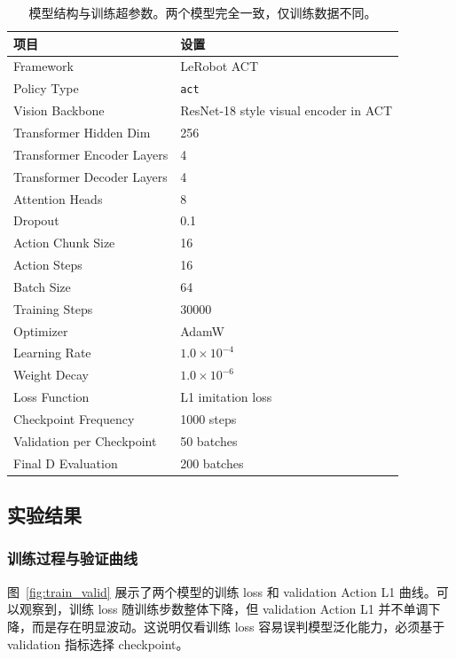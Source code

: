\documentclass[11pt,UTF8,fontset=fandol]{ctexart}
\newcommand{\actlone}{Action L1}
\begin{document}
\begin{table}[t]
\centering
\caption{模型结构与训练超参数。两个模型完全一致，仅训练数据不同。}
\label{tab:hparams}
\begin{tabular}{ll}
\toprule
项目 & 设置 \\
\midrule
Framework & LeRobot ACT \\
Policy Type & \texttt{act} \\
Vision Backbone & ResNet-18 style visual encoder in ACT \\
Transformer Hidden Dim & 256 \\
Transformer Encoder Layers & 4 \\
Transformer Decoder Layers & 4 \\
Attention Heads & 8 \\
Dropout & 0.1 \\
Action Chunk Size & 16 \\
Action Steps & 16 \\
Batch Size & 64 \\
Training Steps & 30000 \\
Optimizer & AdamW \\
Learning Rate & $1.0\times 10^{-4}$ \\
Weight Decay & $1.0\times 10^{-6}$ \\
Loss Function & L1 imitation loss \\
Checkpoint Frequency & 1000 steps \\
Validation per Checkpoint & 50 batches \\
Final D Evaluation & 200 batches \\
\bottomrule
\end{tabular}
\end{table}

\subsection{实验结果}
\subsubsection{训练过程与验证曲线}
图~\ref{fig:train_valid} 展示了两个模型的训练 loss 和 validation \actlone{} 曲线。可以观察到，训练 loss 随训练步数整体下降，但 validation \actlone{} 并不单调下降，而是存在明显波动。这说明仅看训练 loss 容易误判模型泛化能力，必须基于 validation 指标选择 checkpoint。
\end{document}
